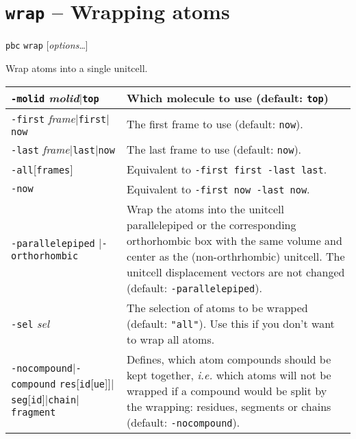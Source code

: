\documentclass[a4paper, DIV12]{scrartcl}
\newcommand{\ie}{\emph{i.e.}\xspace}
\begin{document}
\newpage
\section{\texttt{wrap} -- Wrapping atoms}
\label{sec:wrap}


\texttt{pbc} \texttt{wrap} [\textit{options}\dots]


Wrap atoms into a single unitcell.


\begin{tabular}{|p{}|p{}|}
\hline

\texttt{-molid} \textit{molid}$|$\texttt{top}
& Which molecule to use (default: \texttt{top})
\\ \hline

\texttt{-first} \textit{frame}$|$\texttt{first}$|$\texttt{now}
& The first frame to use (default: \texttt{now}).
\\ \hline

\texttt{-last} \textit{frame}$|$\texttt{last}$|$\texttt{now}
& The last frame to use (default: \texttt{now}).
\\ \hline

\texttt{-all}[\texttt{frames}]
& Equivalent to \texttt{-first first -last last}.
\\ \hline

\texttt{-now}
& Equivalent to \texttt{-first now -last now}.
\\ \hline

\texttt{-parallelepiped} $|$\texttt{-orthorhombic}
& Wrap the atoms into the unitcell parallelepiped or the corresponding
orthorhombic box with the same volume and center as the
(non-orthrhombic) unitcell. The unitcell displacement vectors are not
changed (default: \texttt{-parallelepiped}).
\\ \hline

\texttt{-sel} \textit{sel}
& The selection of atoms to be wrapped (default: \texttt{"all"}). Use
this if you don't want to wrap all atoms.
\\ \hline

\texttt{-nocompound}\linebreak $|$\texttt{-compound} \texttt{res}[\texttt{id}[\texttt{ue}]]$|$\texttt{seg}[\texttt{id}]$|$\texttt{chain}$|$\texttt{fragment}
& Defines, which atom compounds should be kept together, \ie which
atoms will not be wrapped if a compound would be split by the
wrapping: residues, segments or chains (default:
\texttt{-nocompound}).
\\ \hline


\end{tabular}
\end{document}
